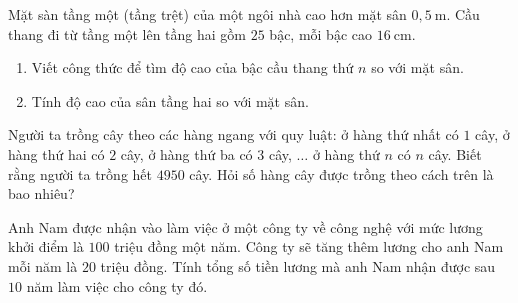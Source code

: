 \begin{bt}%
 Mặt sàn tầng một (tầng trệt) của một ngôi nhà cao hơn mặt sân $0{,}5 \mathrm{~m}$. Cầu thang đi từ tầng một lên tầng hai gồm $25$ bậc, mỗi bậc cao $16 \mathrm{~cm}$.
 	\begin{enumerate}
\item Viết công thức để tìm độ cao của bậc cầu thang thứ $n$ so với mặt sân.
\item  Tính độ cao của sân tầng hai so với mặt sân.
\end{enumerate}
\end{bt}

\begin{bt}%
 
	Người ta trồng cây theo các hàng ngang với quy luật: ở hàng thứ nhất có $1$ cây, ở hàng thứ hai có $2$ cây, ở hàng thứ ba có $3$ cây, $\ldots$ ở hàng thứ $n$ có $n$ cây. Biết rằng người ta trồng hết $4950$ cây. Hỏi số hàng cây được trồng theo cách trên là bao nhiêu?
\end{bt}

\begin{bt}%

Anh Nam được nhận vào làm việc ở một công ty về công nghệ với mức lương khởi điểm là $100$ triệu đồng một năm. Công ty sẽ tăng thêm lương cho anh Nam mỗi năm là $20$ triệu đồng. Tính tổng số tiền lương mà anh Nam nhận được sau $10$ năm làm việc cho công ty đó.
\end{bt}

